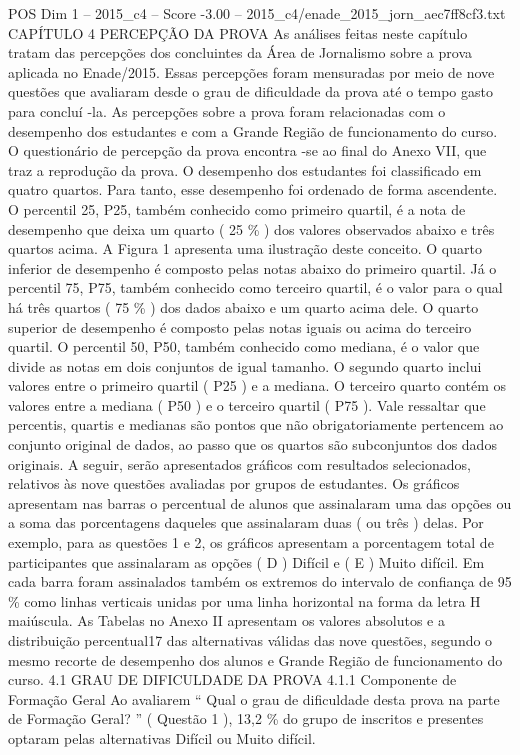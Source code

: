 \begin{textsample}{POS Dim 1 – 2015\_c4 – Score -3.00 – 2015\_c4/enade\_2015\_jorn\_aec7ff8cf3.txt}  \label{ex:f1_pos_334}
CAPÍTULO 4 PERCEPÇÃO DA PROVA As análises feitas neste capítulo tratam das percepções dos concluintes da Área de Jornalismo sobre a prova aplicada no Enade/2015.
Essas percepções foram mensuradas por meio de nove questões que avaliaram desde o grau de dificuldade da prova até o tempo gasto para concluí -la.
As percepções sobre a prova foram relacionadas com o desempenho dos estudantes e com a Grande Região de funcionamento do curso.
O questionário de percepção da prova encontra -se ao final do Anexo VII, que traz a reprodução da prova.
O desempenho dos estudantes foi classificado em quatro quartos.
Para tanto, esse desempenho foi ordenado de forma ascendente.
O percentil 25, P25, também conhecido como primeiro quartil, é a nota de desempenho que deixa um quarto ( 25 \% ) dos valores observados abaixo e três quartos acima.
A Figura 1 apresenta uma ilustração deste conceito.
O quarto inferior de desempenho é composto pelas notas abaixo do primeiro quartil.
Já o percentil 75, P75, também conhecido como terceiro quartil, é o valor para o qual há três quartos ( 75 \% ) dos dados abaixo e um quarto acima dele.
O quarto superior de desempenho é composto pelas notas iguais ou acima do terceiro quartil.
O percentil 50, P50, também conhecido como mediana, é o valor que divide as notas em dois conjuntos de igual tamanho.
O segundo quarto inclui valores entre o primeiro quartil ( P25 ) e a mediana.
O terceiro quarto contém os valores entre a mediana ( P50 ) e o terceiro quartil ( P75 ).
Vale ressaltar que percentis, quartis e medianas são pontos que não obrigatoriamente pertencem ao conjunto original de dados, ao passo que os quartos são subconjuntos dos dados originais.
A seguir, serão apresentados gráficos com resultados selecionados, relativos às nove questões avaliadas por grupos de estudantes.
Os gráficos apresentam nas barras o percentual de alunos que assinalaram uma das opções ou a soma das porcentagens daqueles que assinalaram duas ( ou três ) delas.
Por exemplo, para as questões 1 e 2, os gráficos apresentam a porcentagem total de participantes que assinalaram as opções ( D ) Difícil e ( E ) Muito difícil.
Em cada barra foram assinalados também os extremos do intervalo de confiança de 95 \% como linhas verticais unidas por uma linha horizontal na forma da letra H maiúscula.
As Tabelas no Anexo II apresentam os valores absolutos e a distribuição percentual17 das alternativas válidas das nove questões, segundo o mesmo recorte de desempenho dos alunos e Grande Região de funcionamento do curso. 4.1 GRAU DE DIFICULDADE DA PROVA 4.1.1 Componente de Formação Geral Ao avaliarem “ Qual o grau de dificuldade desta prova na parte de Formação Geral? ” ( Questão 1 ), 13,2 \% do grupo de inscritos e presentes optaram pelas alternativas Difícil ou Muito difícil.

\end{textsample}
